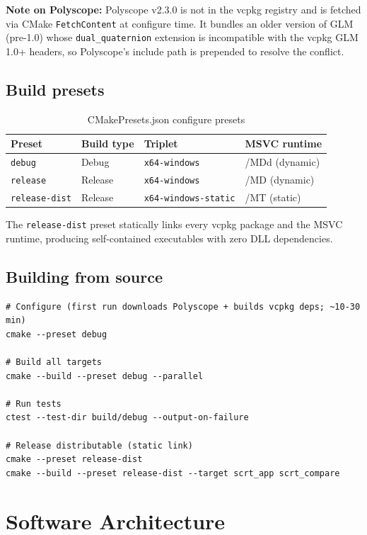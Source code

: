 \documentclass[12pt,a4paper]{report}
\begin{document}
\noindent\textbf{Note on Polyscope:} Polyscope v2.3.0 is not in the vcpkg registry and is
fetched via CMake \texttt{FetchContent} at configure time.  It bundles an older version of
GLM (pre-1.0) whose \texttt{dual\_quaternion} extension is incompatible with the vcpkg GLM
1.0+ headers, so Polyscope's include path is prepended to resolve the conflict.

\section{Build presets}

\begin{table}[H]\centering
\caption{CMakePresets.json configure presets}
\begin{tabular}{llll}
\toprule
Preset & Build type & Triplet & MSVC runtime \\
\midrule
\texttt{debug}        & Debug   & \texttt{x64-windows}        & /MDd (dynamic) \\
\texttt{release}      & Release & \texttt{x64-windows}        & /MD  (dynamic) \\
\texttt{release-dist} & Release & \texttt{x64-windows-static} & /MT  (static)  \\
\bottomrule
\end{tabular}
\end{table}

The \texttt{release-dist} preset statically links every vcpkg package and the MSVC
runtime, producing self-contained executables with zero DLL dependencies.

\section{Building from source}

\begin{lstlisting}[style=shell]
# Configure (first run downloads Polyscope + builds vcpkg deps; ~10-30 min)
cmake --preset debug

# Build all targets
cmake --build --preset debug --parallel

# Run tests
ctest --test-dir build/debug --output-on-failure

# Release distributable (static link)
cmake --preset release-dist
cmake --build --preset release-dist --target scrt_app scrt_compare
\end{lstlisting}

\chapter{Software Architecture}
\end{document}
